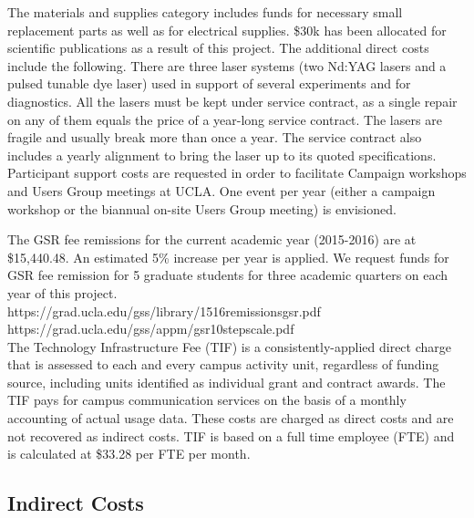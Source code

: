 \documentclass[11pt]{article}
\begin{document}
The materials and supplies category includes funds for necessary small
replacement parts as well as for electrical supplies. \$30k has been
allocated for scientific publications as a result of this project. The
additional direct costs include the following.  There are three laser
systems (two Nd:YAG lasers and a pulsed tunable dye laser) used in
support of several experiments and for diagnostics. All the lasers
must be kept under service contract, as a single repair on any of them
equals the price of a year-long service contract. The lasers are
fragile and usually break more than once a year. The service contract
also includes a yearly alignment to bring the laser up to its quoted
specifications.  Participant support costs are requested in order to
facilitate Campaign workshops and Users Group meetings at UCLA.  One
event per year (either a campaign workshop or the biannual on-site
Users Group meeting) is envisioned.


The GSR fee remissions for the current academic year (2015-2016) are
at \$15,440.48. An estimated 5\% increase per year is applied. We
request funds for GSR fee remission for 5 graduate students for three
academic quarters on each year of this project. \\[0.1truein]
{\ttfamily https://grad.ucla.edu/gss/library/1516remissionsgsr.pdf} \\
{\ttfamily https://grad.ucla.edu/gss/appm/gsr10stepscale.pdf} \\

The Technology Infrastructure Fee (TIF) is a consistently-applied direct charge that
is assessed to each and every campus activity unit, regardless of
funding source, including units identified as individual grant and
contract awards.  The TIF pays for campus communication services on
the basis of a monthly accounting of actual usage data.  These costs
are charged as direct costs and are not recovered as indirect costs.
TIF is based on a full time employee (FTE) and is calculated at \$33.28
per FTE per month.  

\subsection*{Indirect Costs}
\end{document}
